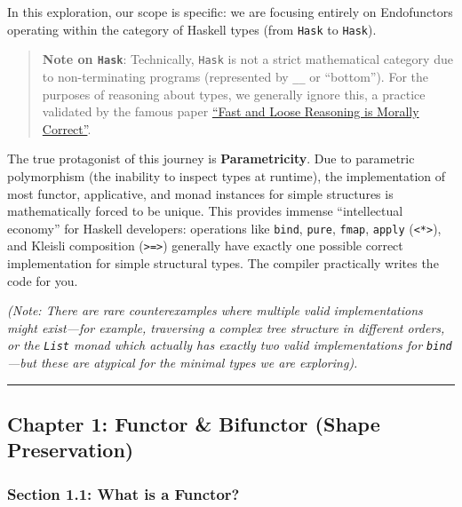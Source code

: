 \documentclass[
]{article}
\begin{document}
In this exploration, our scope is specific: we are focusing entirely on
Endofunctors operating within the category of Haskell types (from
\texttt{Hask} to \texttt{Hask}).

\begin{quote}
\textbf{Note on \texttt{Hask}}: Technically, \texttt{Hask} is not a
strict mathematical category due to non-terminating programs
(represented by \texttt{\_\textbar{}\_} or ``bottom''). For the purposes
of reasoning about types, we generally ignore this, a practice validated
by the famous paper
\href{https://www.cse.chalmers.se/~nad/publications/danielsson-et-al-popl2006.pdf}{``Fast
and Loose Reasoning is Morally Correct''}.
\end{quote}

The true protagonist of this journey is \textbf{Parametricity}. Due to
parametric polymorphism (the inability to inspect types at runtime), the
implementation of most functor, applicative, and monad instances for
simple structures is mathematically forced to be unique. This provides
immense ``intellectual economy'' for Haskell developers: operations like
\texttt{bind}, \texttt{pure}, \texttt{fmap}, \texttt{apply}
(\texttt{\textless{}*\textgreater{}}), and Kleisli composition
(\texttt{\textgreater{}=\textgreater{}}) generally have exactly one
possible correct implementation for simple structural types. The
compiler practically writes the code for you.

\emph{(Note: There are rare counterexamples where multiple valid
implementations might exist---for example, traversing a complex tree
structure in different orders, or the \texttt{List} monad which actually
has exactly two valid implementations for \texttt{bind}---but these are
atypical for the minimal types we are exploring).}

\begin{center}\rule{0.5\linewidth}{0.5pt}\end{center}

\subsection{Chapter 1: Functor \& Bifunctor (Shape
Preservation)}\label{chapter-1-functor-bifunctor-shape-preservation}

\subsubsection{Section 1.1: What is a
Functor?}\label{section-1.1-what-is-a-functor}
\end{document}
